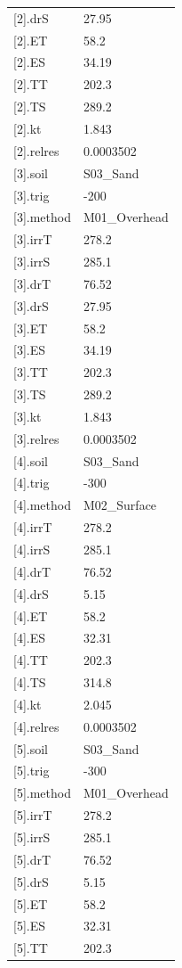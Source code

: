 {\begin{longtable}{p{}p{}}
{}[2].drS & 27.95\\
{}[2].ET & 58.2\\
{}[2].ES & 34.19\\
{}[2].TT & 202.3\\
{}[2].TS & 289.2\\
{}[2].kt & 1.843\\
{}[2].relres & 0.0003502\\
{}[3].soil & S03\_Sand\\
{}[3].trig & -200\\
{}[3].method & M01\_Overhead\\
{}[3].irrT & 278.2\\
{}[3].irrS & 285.1\\
{}[3].drT & 76.52\\
{}[3].drS & 27.95\\
{}[3].ET & 58.2\\
{}[3].ES & 34.19\\
{}[3].TT & 202.3\\
{}[3].TS & 289.2\\
{}[3].kt & 1.843\\
{}[3].relres & 0.0003502\\
{}[4].soil & S03\_Sand\\
{}[4].trig & -300\\
{}[4].method & M02\_Surface\\
{}[4].irrT & 278.2\\
{}[4].irrS & 285.1\\
{}[4].drT & 76.52\\
{}[4].drS & 5.15\\
{}[4].ET & 58.2\\
{}[4].ES & 32.31\\
{}[4].TT & 202.3\\
{}[4].TS & 314.8\\
{}[4].kt & 2.045\\
{}[4].relres & 0.0003502\\
{}[5].soil & S03\_Sand\\
{}[5].trig & -300\\
{}[5].method & M01\_Overhead\\
{}[5].irrT & 278.2\\
{}[5].irrS & 285.1\\
{}[5].drT & 76.52\\
{}[5].drS & 5.15\\
{}[5].ET & 58.2\\
{}[5].ES & 32.31\\
{}[5].TT & 202.3\\

\end{longtable}}
